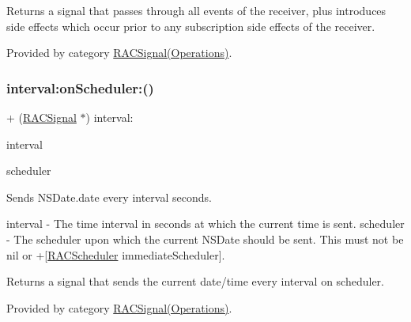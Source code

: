 Returns a signal that passes through all events of the receiver, plus introduces side effects which occur prior to any subscription side effects of the receiver. 

Provided by category \mbox{\hyperlink{category_r_a_c_signal_07_operations_08_a2c8566a5d3b5997357d34ee5991a2e0c}{R\+A\+C\+Signal(\+Operations)}}.

\mbox{\label{interface_r_a_c_signal_a65442f423ebf08b9217f7bb206780a45}} 
\subsubsection{\texorpdfstring{interval\+:on\+Scheduler\+:()}{interval:onScheduler:()}\hspace{0.1cm}{\footnotesize\ttfamily [1/3]}}
{\footnotesize\ttfamily + (\mbox{\hyperlink{interface_r_a_c_signal}{R\+A\+C\+Signal}} $\ast$) interval\+: \begin{DoxyParamCaption}\item[{(N\+S\+Time\+Interval)}]{interval }\item[{onScheduler:(\mbox{\hyperlink{interface_r_a_c_scheduler}{R\+A\+C\+Scheduler}} $\ast$)}]{scheduler }\end{DoxyParamCaption}}

Sends N\+S\+Date.\+date every {\ttfamily interval} seconds.

interval -\/ The time interval in seconds at which the current time is sent. scheduler -\/ The scheduler upon which the current N\+S\+Date should be sent. This must not be nil or +\mbox{[}\mbox{\hyperlink{interface_r_a_c_scheduler}{R\+A\+C\+Scheduler}} immediate\+Scheduler\mbox{]}.

Returns a signal that sends the current date/time every {\ttfamily interval} on {\ttfamily scheduler}. 

Provided by category \mbox{\hyperlink{category_r_a_c_signal_07_operations_08_a65442f423ebf08b9217f7bb206780a45}{R\+A\+C\+Signal(\+Operations)}}.

